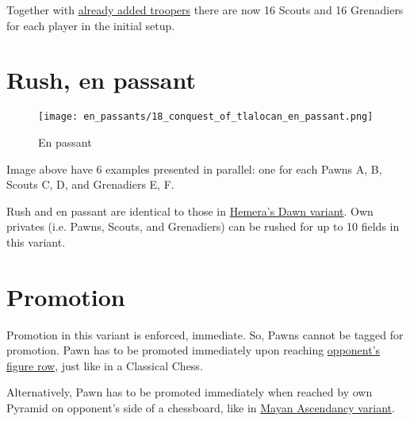 Together with
\hyperref[fig:14_hemera_s_dawn]{already added troopers} there are now
16 Scouts and 16 Grenadiers for each player in the initial setup.

\clearpage %

\section*{Rush, en passant}
\label{sec:Conquest of Tlalocan/Rush, en passant}

\vspace*{-1.4\baselineskip}
\noindent
\begin{figure}[!h]
\texttt{[image: en\_passants/18\_conquest\_of\_tlalocan\_en\_passant.png]}
\vspace*{-1.3\baselineskip}
\caption{En passant}
\label{fig:18_conquest_of_tlalocan_en_passant}
\end{figure}

\vspace*{-0.5\baselineskip}
Image above have 6 examples presented in parallel: one for each Pawns A, B,
Scouts C, D, and Grenadiers E, F.

Rush and en passant are identical to those in
\hyperref[fig:14_hemera_s_dawn_en_passant]{Hemera's Dawn variant}.
Own privates (i.e. Pawns, Scouts, and Grenadiers) can be rushed for up to 10
fields in this variant.

\clearpage %

\section*{Promotion}
\label{sec:Conquest of Tlalocan/Promotion}

Promotion in this variant is enforced, immediate. So, Pawns cannot be tagged
for promotion. Pawn has to be promoted immediately upon reaching
\hyperref[sec:Terms/Figure row]{opponent's figure row},
just like in a Classical Chess.

Alternatively, Pawn has to be promoted immediately when reached by own Pyramid
on opponent's side of a chessboard, like in
\hyperref[sec:Mayan Ascendancy/Pyramid/Promotion]{Mayan Ascendancy variant}.

\clearpage %

